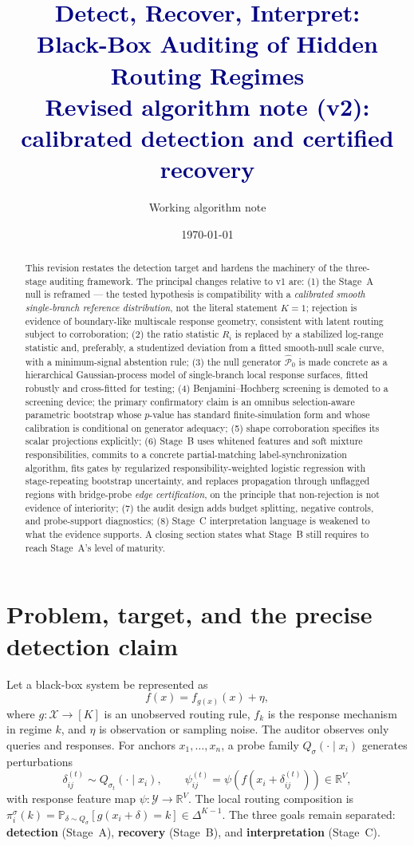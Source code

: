 \documentclass[11pt]{article}
\title{\textcolor{navy}{Detect, Recover, Interpret:\\
Black-Box Auditing of Hidden Routing Regimes\\
\large Revised algorithm note (v2): calibrated detection and certified recovery}}
\author{Working algorithm note}
\date{\today}
\newcommand{\R}{\mathbb{R}}
\newcommand{\Prob}{\mathbb{P}}
\newcommand{\simplex}{\Delta}
\newcommand{\nullgen}{\widehat{\mathcal P}_0}
\begin{document}
\maketitle

\begin{abstract}
This revision restates the detection target and hardens the machinery of the three-stage
auditing framework. The principal changes relative to v1 are:
(1) the Stage~A null is reframed --- the tested hypothesis is compatibility with a
\emph{calibrated smooth single-branch reference distribution}, not the literal statement
$K=1$; rejection is evidence of boundary-like multiscale response geometry, consistent with
latent routing subject to corroboration;
(2) the ratio statistic $R_i$ is replaced by a stabilized log-range statistic and, preferably,
a studentized deviation from a fitted smooth-null scale curve, with a minimum-signal
abstention rule;
(3) the null generator $\nullgen$ is made concrete as a hierarchical Gaussian-process model of
single-branch local response surfaces, fitted robustly and cross-fitted for testing;
(4) Benjamini--Hochberg screening is demoted to a screening device; the primary confirmatory
claim is an omnibus selection-aware parametric bootstrap whose $p$-value has standard
finite-simulation form and whose calibration is conditional on generator adequacy;
(5) shape corroboration specifies its scalar projections explicitly;
(6) Stage~B uses whitened features and soft mixture responsibilities, commits to a concrete
partial-matching label-synchronization algorithm, fits gates by regularized responsibility-weighted
logistic regression with stage-repeating bootstrap uncertainty, and replaces propagation
through unflagged regions with bridge-probe \emph{edge certification}, on the principle that
non-rejection is not evidence of interiority;
(7) the audit design adds budget splitting, negative controls, and probe-support diagnostics;
(8) Stage~C interpretation language is weakened to what the evidence supports. A closing
section states what Stage~B still requires to reach Stage~A's level of maturity.
\end{abstract}

\section{Problem, target, and the precise detection claim}

Let a black-box system be represented as
\[
  f(x)=f_{g(x)}(x)+\eta,
\]
where \(g:\mathcal X\to[K]\) is an unobserved routing rule, \(f_k\) is the response mechanism
in regime \(k\), and \(\eta\) is observation or sampling noise. The auditor observes only
queries and responses. For anchors \(x_1,\ldots,x_n\), a probe family
\(Q_\sigma(\cdot\mid x_i)\) generates perturbations
\[
  \delta_{ij}^{(t)}\sim Q_{\sigma_t}(\cdot\mid x_i),
  \qquad
  \psi_{ij}^{(t)}=\psi\!\left(f(x_i+\delta_{ij}^{(t)})\right)\in\R^V,
\]
with response feature map \(\psi:\mathcal Y\to\R^V\). The local routing composition is
\(\pi_i^\sigma(k)=\Prob_{\delta\sim Q_\sigma}[g(x_i+\delta)=k]\in\simplex^{K-1}\).
The three goals remain separated: \textbf{detection} (Stage~A), \textbf{recovery} (Stage~B),
and \textbf{interpretation} (Stage~C).
\end{document}
